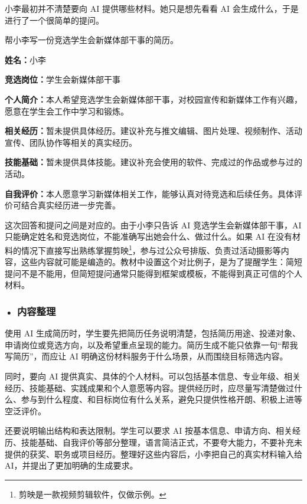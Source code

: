 小李最初并不清楚要向 AI 提供哪些材料。她只是想先看看 AI 会生成什么，于是进行了一个很简单的提问。

\begin{userbox}
帮小李写一份竞选学生会新媒体部干事的简历。
\end{userbox}

\begin{aibox}
\textbf{姓名：}小李

\textbf{竞选岗位：}学生会新媒体部干事

\textbf{个人简介：}本人希望竞选学生会新媒体部干事，对校园宣传和新媒体工作有兴趣，愿意在学生会工作中学习和锻炼。

\textbf{相关经历：}暂未提供具体经历。建议补充与推文编辑、图片处理、视频制作、活动宣传、团队协作等相关的真实经历。

\textbf{技能基础：}暂未提供具体技能。建议补充会使用的软件、完成过的作品或参与过的活动。

\textbf{自我评价：}本人愿意学习新媒体相关工作，能够认真对待竞选和后续任务。具体评价可结合真实经历进一步完善。
\end{aibox}

这次回答和提问之间是对应的。由于小李只告诉 AI 竞选学生会新媒体部干事，AI 只能确定姓名和竞选岗位，不能准确写出她会什么、做过什么。如果 AI 在没有材料的情况下直接写出熟练掌握剪映\footnote{剪映是一款视频剪辑软件，仅做示例。}，参与过公众号排版、负责过活动摄影等内容，这些内容就可能是编造的。教材中设置这个对比例子，是为了提醒学生：简短提问不是不能用，但简短提问通常只能得到框架或模板，不能得到真正可信的个人材料。

\subsubsection*{\textbf{• 内容整理}}

使用 AI 生成简历时，学生要先把简历任务说明清楚，包括简历用途、投递对象、申请岗位或竞选方向，以及希望重点呈现的能力。简历生成不能只依靠一句“帮我写简历”，而应让 AI 明确这份材料服务于什么场景，从而围绕目标筛选内容。

同时，要向 AI 提供真实、具体的个人材料。可以包括基本信息、专业年级、相关经历、技能基础、实践成果和个人意愿等内容。提供经历时，应尽量写清楚做过什么、参与到什么程度、和目标岗位有什么关系，避免只提供性格开朗、积极上进等空泛评价。

还要说明输出结构和表达限制。学生可以要求 AI 按基本信息、申请方向、相关经历、技能基础、自我评价等部分整理，语言简洁正式，不要夸大能力，不要补充未提供的获奖、职务或项目经历。整理好这些内容后，小李把自己的真实材料输入给 AI，并提出了更加明确的生成要求。

